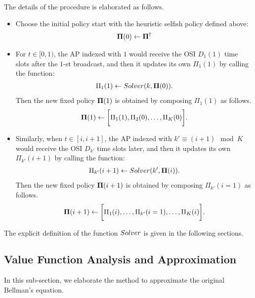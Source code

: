 The details of the procedure is elaborated as follows.
\begin{itemize}
    \item Choose the initial policy start with the heuristic selfish policy defined above:
    \begin{align*}
        \boldsymbol{\Pi}(0) \gets \boldsymbol{\Pi}^{\dagger}
    \end{align*}

    \item For $t\in[0, 1)$, the AP indexed with $1$ would receive the OSI $D_1(1)$ time slots after the $1$-st broadcast, and then it updates its own $\Pi_{1}(1)$ by calling the function:
    \begin{align*}
        \Pi_{1}(1) \gets Solver(k, \boldsymbol{\Pi}(0)).
    \end{align*}
    Then the new fixed policy $\boldsymbol{\Pi}(1)$ is obtained by composing $\Pi_{1}(1)$ as follows.
    \begin{align*}
        \boldsymbol{\Pi}(1) \gets \bigg[\Pi_{1}(1), \Pi_{2}(0), \dots, \Pi_{K}(0)\bigg].
    \end{align*}

    \item Similarly, when $t\in[i, i+1]$, the AP indexed with $k' \equiv (i + 1)\mod{K}$ would receive the OSI $D_{k'}$ time slots later, and then it updates its own $\Pi_{k'}(i+1)$ by calling the function:
    \begin{align*}
        \Pi_{k'}(i+1) \gets Solver(k', \boldsymbol{\Pi}(i)).
    \end{align*}
    Then the new fixed policy $\boldsymbol{\Pi}(i+1)$ is obtained by composing $\Pi_{k'}(i=1)$ as follows.
    \begin{align*}
        \boldsymbol{\Pi}(i+1) \gets \bigg[\Pi_{1}(i), \dots, \Pi_{k'}(i=1), \dots, \Pi_{K}(i)\bigg].
    \end{align*}
\end{itemize}
The explicit definition of the function $Solver$ is given in the following sections.

\subsection{Value Function Analysis and Approximation}
In this sub-section, we elaborate the method to approximate the original Bellman's equation.


